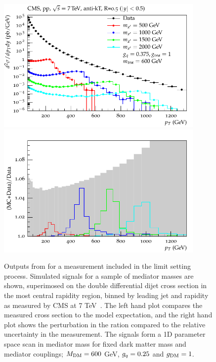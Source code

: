 \documentclass[floatfix]{article}
\begin{document}
\begin{figure}
\centering      
      \includegraphics[width=0.9\textwidth]{images/cmsjet/fullrange/CMSincljet.pdf}
      \includegraphics[width=0.9\textwidth]{images/cmsjet/ratio/CMSincljets_ratio.pdf}
\caption{Outputs from \rivet for a measurement included in the limit setting process. Simulated signals for a sample of mediator masses are shown, superimosed on 
the double differential dijet cross section in the most central rapidity region, binned by leading jet \pt and rapidity as measured by 
CMS at 7 TeV~\cite{Chatrchyan:2014gia}. The left hand plot compares the measured cross section to the model expectation, and the right hand plot shows the perturbation 
in the ration compared to the relative uncertainty in the measurement. The signals form a 1D parameter space scan in mediator mass for fixed dark matter mass 
and mediator couplings; $M_{\rm DM}=600$ GeV, $g_{q}=0.25$ and $g_{\rm DM} = 1$.}
\label{fig:CMSincljet}
\end{figure}
\end{document}
